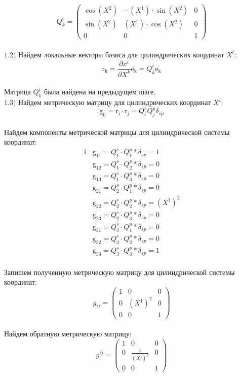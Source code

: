 \documentclass{article}
\begin{document}
\[
Q^i_k=\begin{pmatrix}
	\cos(X^2) & -(X^1)\cdot \sin(X^2) & 0\\
	\sin(X^2) & (X^1)\cdot \cos(X^2) & 0\\
	0 & 0 & 1
\end{pmatrix}
\]\\
$\mathrm{1.2)}$ Найдем локальные векторы базиса для цилиндрических координат $X^i$:\\
\[
\mathrm{r_k} = \frac{\partial x^i}{\partial X^k}\overline{\mathrm{e_k}} = Q^i_k\overline{\mathrm{e_k}}
\]\\
Матрица $Q^i_k$ была найдена на предыдущем шаге.\\
$\mathrm{1.3)}$ Найдем метрическую матрицу для цилиндрических координат $X^i$:\\
\[
\mathrm{g_{{ij}}} = \mathrm{r_i}\cdot\mathrm{r_j} = Q^s_iQ^p_j\delta_{sp}
\]\\
Найдем компоненты метрической матрицы для цилиндрической системы координат:\\
\begin{alignat*}{1}
  & \mathrm{g_{11}} = Q^s_1 \cdot Q^p_1 * \delta_{sp} = 1 \\
  & \mathrm{g_{12}} = Q^s_1 \cdot Q^p_2 * \delta_{sp} = 0 \\
  & \mathrm{g_{13}} = Q^s_1 \cdot Q^p_3 * \delta_{sp} = 0 \\
  & \mathrm{g_{21}} = Q^s_2 \cdot Q^p_1 * \delta_{sp} = 0 \\
  & \mathrm{g_{22}} = Q^s_2 \cdot Q^p_2 * \delta_{sp} = (X^1)^2 \\
  & \mathrm{g_{23}} = Q^s_2 \cdot Q^p_3 * \delta_{sp} = 0 \\
  & \mathrm{g_{31}} = Q^s_3 \cdot Q^p_1 * \delta_{sp} = 0 \\
  & \mathrm{g_{32}} = Q^s_3 \cdot Q^p_2 * \delta_{sp} = 0 \\
  & \mathrm{g_{33}} = Q^s_3 \cdot Q^p_3 * \delta_{sp} = 1 
\end{alignat*}\\
Запишем полученную метрическую матрицу для цилиндрической системы координат:\\
\[
g_{ij}=\begin{pmatrix}
	1 & 0 & 0\\
	0 & (X^1)^2 & 0\\
	0 & 0 & 1
\end{pmatrix}
\]\\
Найдем обратную метрическую матрицу:\\
\[
g^{ij}=\begin{pmatrix}
	1 & 0 & 0\\
	0 & \frac{1}{(X^1)^2} & 0\\
	0 & 0 & 1
\end{pmatrix}
\]\\
\end{document}
